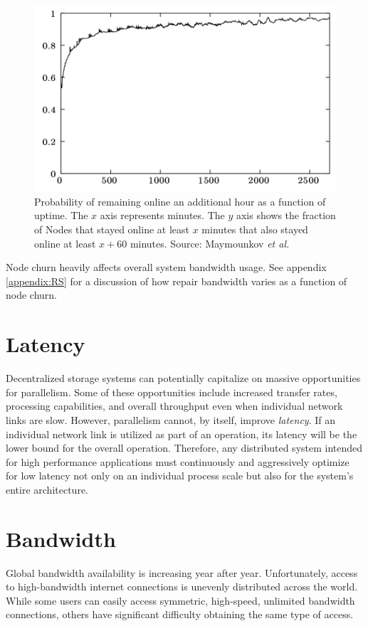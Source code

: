 \documentclass[8pt,fleqn,openany]{book}
\begin{document}
\begin{figure}
\centering
\includegraphics[width=.6\textwidth]{images/uptime.png}
\caption{Probability of remaining online an additional hour as a function of
uptime.
The $x$ axis represents minutes. The $y$ axis shows the fraction of Nodes
that stayed online at least $x$ minutes that also stayed online at least
$x+60$ minutes. Source: Maymounkov {\em et al.} \cite{kad}}
\label{fig:kad-uptime}
\end{figure}

Node churn heavily affects overall system bandwidth usage.
See appendix \ref{appendix:RS} for a discussion of how repair bandwidth
varies as a function of node churn.

\section{Latency}

Decentralized storage systems can potentially capitalize on
massive opportunities for parallelism.
Some of these opportunities include increased transfer rates, processing
capabilities, and overall throughput even when individual
network links are slow. However, parallelism cannot, by itself, improve {\em
latency}. If an individual network link is utilized as part of an operation,
its latency will be the lower bound for the overall operation.
Therefore, any distributed system
intended for high performance applications must continuously and aggressively
optimize for low latency not only on an individual process scale but also for
the system's entire architecture.

\section{Bandwidth}\label{sec:req-bandwidth}

Global bandwidth availability is increasing year after year. Unfortunately,
access to
high-bandwidth internet connections is unevenly distributed across the world.
While some users can easily access symmetric, high-speed, unlimited bandwidth
connections, others have significant difficulty obtaining the same type of access.
\end{document}
